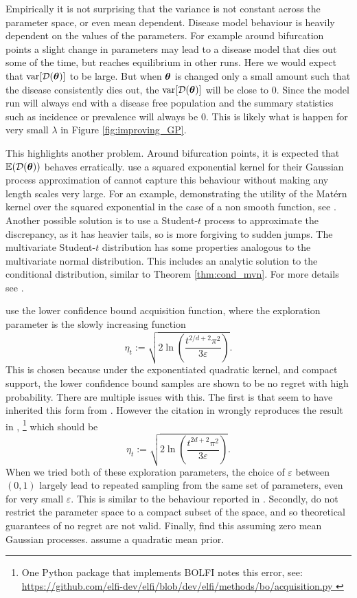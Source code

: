 Empirically it is not surprising that the variance is not constant across the
parameter space, or even mean dependent. Disease model behaviour is heavily
dependent on the values of the parameters. For example around bifurcation points
a slight change in parameters may lead to a disease model that dies out some
of the time, but reaches equilibrium in other runs. Here we would expect that
$\operatorname{var}[\mathcal{D}(\bm{\theta})]$ to be large. But when $\bm{\theta}$ is changed only a small
amount such that the disease consistently dies out, the $\operatorname{var}[\mathcal{D}(\bm{\theta})]$
will be close to $0.$ Since the model
run will always end with a disease free population and the summary statistics
such as incidence or prevalence will always be $0.$ This is likely what is
happen for very small $\lambda$ in Figure \ref{fig:improving_GP}.

This highlights another problem. Around bifurcation points, it is expected that
$\operatorname{\mathbb{E}}(\mathcal{D}(\bm{\theta}))$ behaves erratically. \cite{gutmann_bayesian_2016} use a
squared exponential kernel for their Gaussian process approximation of
cannot capture this behaviour without
making any length scales very large.
For an example, demonstrating the utility of the Mat\'ern
kernel over the squared exponential in the case of a non smooth function,
see \cite{jones_matern_2021}.
Another possible solution is to use a Student-$t$ process to approximate the
discrepancy, as it has heavier tails, so is more forgiving to sudden jumps.
The multivariate Student-$t$ distribution has some properties analogous to
the multivariate normal distribution. This includes an analytic solution
to the conditional distribution, similar to Theorem \ref{thm:cond_mvn}. For
more details see \cite{shah_studentt_2014}.

\cite{gutmann_bayesian_2016} use the lower confidence bound acquisition
function, where the
exploration parameter is the slowly increasing function
$$\eta_t:= \sqrt{2\ln\left(\frac{t^{2/d + 2}\pi^2}{3\varepsilon}\right)}.$$
This is chosen because under the exponentiated quadratic kernel, and compact
support, the lower confidence bound samples are shown to be no regret with high
probability. There are multiple issues with this. The first is that
 seem to have inherited this form from
\cite{brochu_tutorial_2010}. However the citation in
\cite{brochu_tutorial_2010} wrongly reproduces the result in
\cite{srinivas_gaussian_2010},
\footnote{
    One Python package that implements BOLFI notes this error, see:
    \url{
        https://github.com/elfi-dev/elfi/blob/dev/elfi/methods/bo/acquisition.py
    }
} which should be
$$\eta_t:= \sqrt{2\ln\left(\frac{t^{2d + 2}\pi^2}{3\varepsilon}\right)}.$$
When we tried both of these exploration parameters, the choice of
$\varepsilon$ between $(0, 1)$ largely lead to repeated sampling from the same
set of parameters, even for very small $\varepsilon.$ This is similar to the
behaviour reported in \cite{gutmann_bayesian_2016}. Secondly,
 do not restrict the parameter space to
a compact subset of the space, and so theoretical guarantees of no regret are
not valid. Finally,  find this assuming
zero mean Gaussian processes.  assume
a quadratic mean prior.

